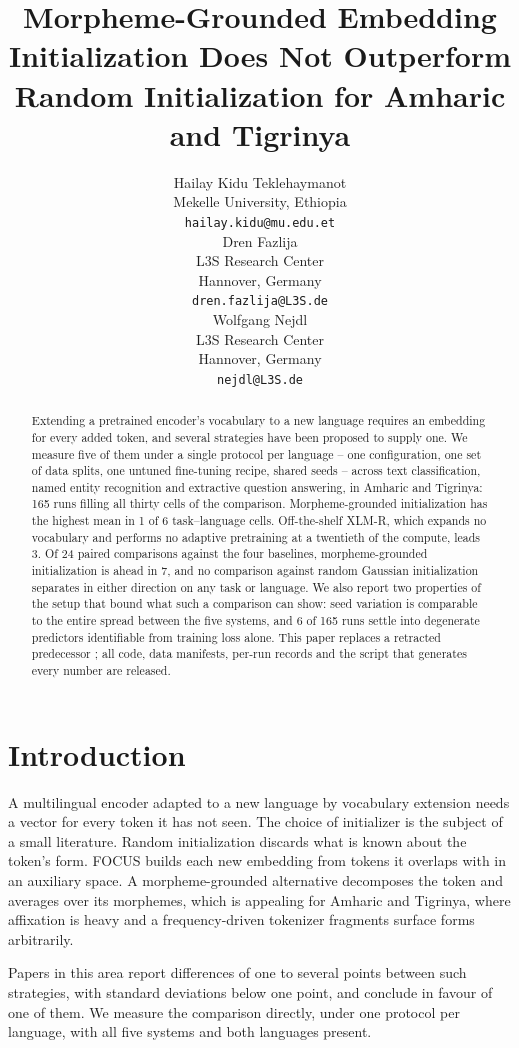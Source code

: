 \documentclass[11pt]{article}
\title{Morpheme-Grounded Embedding Initialization Does Not Outperform\\
Random Initialization for Amharic and Tigrinya}
\author{Hailay Kidu Teklehaymanot \\
  Mekelle University, Ethiopia \\
  \texttt{hailay.kidu@mu.edu.et} \\\And
  Dren Fazlija \\
  L3S Research Center \\
  Hannover, Germany \\
  \texttt{dren.fazlija@L3S.de} \\\And
  Wolfgang Nejdl \\
  L3S Research Center \\
  Hannover, Germany \\
  \texttt{nejdl@L3S.de} \\}
\begin{document}
\maketitle

\begin{abstract}
Extending a pretrained encoder's vocabulary to a new language requires an
embedding for every added token, and several strategies have been proposed to
supply one. We measure five of them under a single protocol per language --
one configuration, one set of data splits, one untuned fine-tuning recipe,
shared seeds -- across text classification, named entity recognition and
extractive question answering, in Amharic and Tigrinya: 165 runs filling all
thirty cells of the comparison. Morpheme-grounded initialization has the
highest mean in 1 of 6 task--language cells. Off-the-shelf XLM-R, which
expands no vocabulary and performs no adaptive pretraining at a twentieth of
the compute, leads 3. Of 24 paired comparisons against the four baselines,
morpheme-grounded initialization is ahead in 7, and no comparison against
random Gaussian initialization separates in either direction on any task or
language. We also report two properties of the setup that bound what such a
comparison can show: seed variation is comparable to the entire spread
between the five systems, and 6 of 165 runs settle into degenerate predictors
identifiable from training loss alone. This paper replaces a retracted
predecessor \citep{teklehaymanot-etal-2026-lgse}; all code, data manifests,
per-run records and the script that generates every number are released.
\end{abstract}

\section{Introduction}

A multilingual encoder adapted to a new language by vocabulary extension
needs a vector for every token it has not seen. The choice of initializer is
the subject of a small literature. Random initialization discards what is
known about the token's form. FOCUS \citep{dobler-de-melo-2023-focus} builds
each new embedding from tokens it overlaps with in an auxiliary space. A
morpheme-grounded alternative decomposes the token and averages over its
morphemes, which is appealing for Amharic and Tigrinya, where affixation is
heavy and a frequency-driven tokenizer fragments surface forms arbitrarily.

Papers in this area report differences of one to several points between such
strategies, with standard deviations below one point, and conclude in favour
of one of them. We measure the comparison directly, under one protocol per
language, with all five systems and both languages present.
\end{document}

